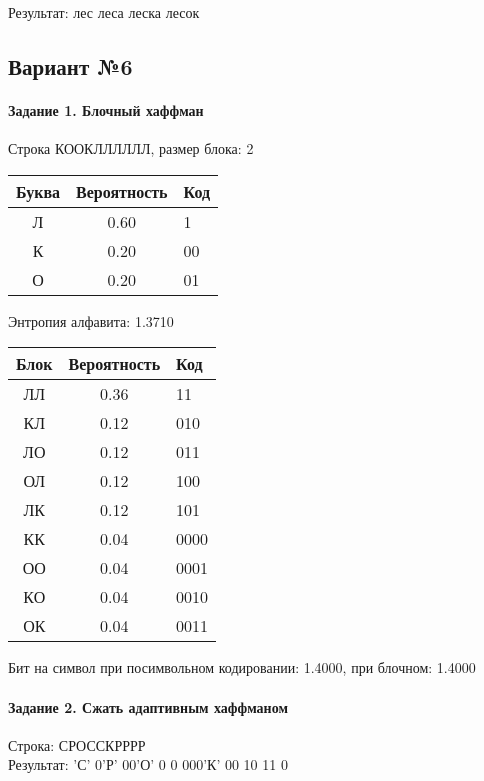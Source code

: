 \documentclass[a4paper, 12pt]{article}
\begin{document}
Результат: лес леса леска лесок
\pagebreak
\subsection{Вариант №6}
\paragraph{Задание 1. Блочный хаффман \\}

Строка КООКЛЛЛЛЛЛ, размер блока: 2
\begin{center}
 \begin{tabular}{ |c|c|l| } 
  \hline
     Буква & Вероятность & Код\\ \hline
Л & 0.60 & 1\\\hline
К & 0.20 & 00\\\hline
О & 0.20 & 01
\\ \hline \end{tabular}
\end{center}
Энтропия алфавита: 1.3710
\begin{center}
 \begin{tabular}{ |c|c|l| } 
  \hline
     Блок & Вероятность & Код\\ \hline
ЛЛ & 0.36 & 11\\\hline
КЛ & 0.12 & 010\\\hline
ЛО & 0.12 & 011\\\hline
ОЛ & 0.12 & 100\\\hline
ЛК & 0.12 & 101\\\hline
КК & 0.04 & 0000\\\hline
ОО & 0.04 & 0001\\\hline
КО & 0.04 & 0010\\\hline
ОК & 0.04 & 0011
\\ \hline \end{tabular}
\end{center}
Бит на символ при посимвольном кодировании: 1.4000, при блочном: 1.4000


\pagebreak
\paragraph{Задание 2. Сжать адаптивным хаффманом\\}

Строка: 
СРОССКРРРР\\
Результат: 'С' 0'Р' 00'О' 0 0 000'К' 00 10 11 0
\end{document}
